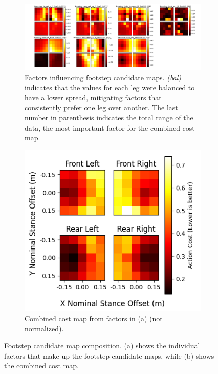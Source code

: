 \begin{figure}[H]
  \centering
  \begin{subfigure}[T]{0.65\textwidth}
    \centering
    \includegraphics[width=\textwidth]{images/data/training/costmap-composition/elements.png}
    \caption{Factors influencing footstep candidate maps. \textit{(bal)}
      indicates that the values for each leg were balanced to have a
      lower spread, mitigating factors that consistently prefer one leg
      over another. The last number in parenthesis indicates the total
    range of the data, the most important factor for the combined cost map.}
    \label{fig:data-costmap-composition-elements}
  \end{subfigure}
  \hfill
  \begin{subfigure}[T]{0.3\textwidth}
    \centering
    \includegraphics[width=\textwidth]{images/data/training/costmap-composition/combined.png}
    \caption{Combined cost map from factors in (a) (not normalized).}
    \label{fig:data-costmap-composition-combined}
  \end{subfigure}
  \hfill
  \caption{Footstep candidate map composition. (a) shows the individual
    factors that make up the footstep candidate maps, while (b) shows
  the   combined cost map.}
  \label{fig:data-costmap-composition}
\end{figure}

